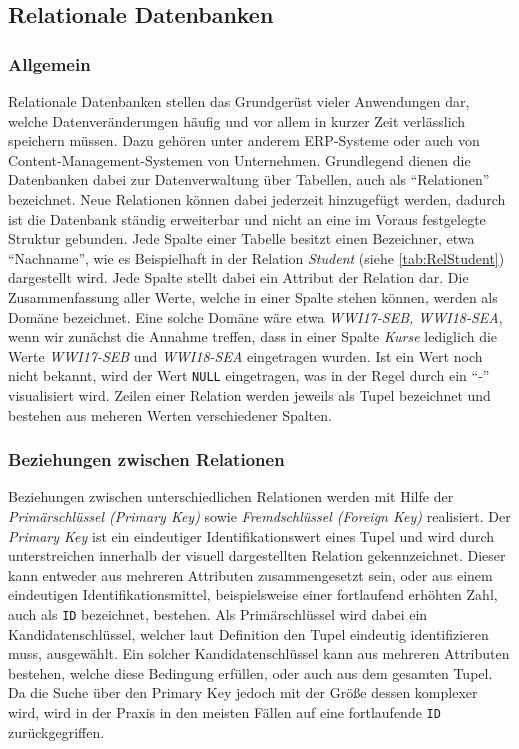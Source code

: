 \subsection{Relationale Datenbanken}

\subsubsection{Allgemein}

Relationale Datenbanken stellen das Grundgerüst vieler Anwendungen dar, welche Datenveränderungen häufig und vor allem in kurzer Zeit verlässlich speichern müssen.
Dazu gehören unter anderem \ac{ERP}-Systeme oder auch von Content-Management-Systemen von Unternehmen.
Grundlegend dienen die Datenbanken dabei zur Datenverwaltung über Tabellen, auch als \enquote{Relationen} bezeichnet.
Neue Relationen können dabei jederzeit hinzugefügt werden, dadurch ist die Datenbank ständig erweiterbar und nicht an eine im Voraus festgelegte Struktur gebunden.
Jede Spalte einer Tabelle besitzt einen Bezeichner, etwa \enquote{Nachname}, wie es Beispielhaft in der Relation \emph{Student} (siehe \vref{tab:RelStudent}) dargestellt wird.
Jede Spalte stellt dabei ein Attribut der Relation dar.
Die Zusammenfassung aller Werte, welche in einer Spalte stehen können, werden als Domäne bezeichnet.
Eine solche Domäne wäre etwa \emph{WWI17-SEB, WWI18-SEA}, wenn wir zunächst die Annahme treffen, dass in einer Spalte \emph{Kurse} lediglich die Werte \emph{WWI17-SEB} und \emph{WWI18-SEA} eingetragen wurden.
Ist ein Wert noch nicht bekannt, wird der Wert \texttt{NULL} eingetragen, was in der Regel durch ein \enquote{-} visualisiert wird.
Zeilen einer Relation werden jeweils als Tupel bezeichnet und bestehen aus meheren Werten verschiedener Spalten.\autocite[vgl. S.9 ff.][]{Book_DB_2}


\subsubsection{Beziehungen zwischen Relationen}
Beziehungen zwischen unterschiedlichen Relationen werden mit Hilfe der \emph{Primärschlüssel (Primary Key)} sowie \emph{Fremdschlüssel (Foreign Key)} realisiert.
Der \emph{Primary Key} ist ein eindeutiger Identifikationswert eines Tupel und wird durch unterstreichen innerhalb der visuell dargestellten Relation gekennzeichnet.
Dieser kann entweder aus mehreren Attributen zusammengesetzt sein, oder aus einem eindeutigen Identifikationsmittel, beispielsweise einer fortlaufend erhöhten Zahl, auch als \texttt{ID} bezeichnet, bestehen.
Als Primärschlüssel wird dabei ein Kandidatenschlüssel, welcher laut Definition den Tupel eindeutig identifizieren muss, ausgewählt.
Ein solcher Kandidatenschlüssel kann aus mehreren Attributen bestehen, welche diese Bedingung erfüllen, oder auch aus dem gesamten Tupel.
Da die Suche über den Primary Key jedoch mit der Größe dessen komplexer wird, wird in der Praxis in den meisten Fällen auf eine fortlaufende \texttt{ID} zurückgegriffen.\autocite{Book_DB_2}


